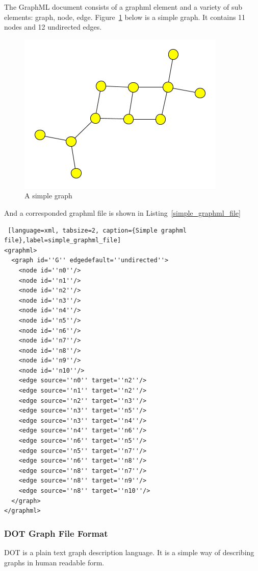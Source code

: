 The GraphML document consists of a graphml element and a variety of sub elements: graph, node, edge. Figure~\ref{fig:simple_graphml} below is a simple graph. It contains 11 nodes and 12 undirected edges.

\begin{figure}[h!]
\centering
\includegraphics[scale=1.0]{pictures/simple.png}
\caption{A simple graph}
\label{fig:simple_graphml}
\end{figure}


And a corresponded graphml file is shown in Listing~\ref{simple_graphml_file}

\begin{center}
\begin{lstlisting} [language=xml, tabsize=2, caption={Simple graphml file},label=simple_graphml_file]
<graphml>
  <graph id=''G'' edgedefault=''undirected''>
    <node id=''n0''/>
    <node id=''n1''/>
    <node id=''n2''/>
    <node id=''n3''/>
    <node id=''n4''/>
    <node id=''n5''/>
    <node id=''n6''/>
    <node id=''n7''/>
    <node id=''n8''/>
    <node id=''n9''/>
    <node id=''n10''/>
    <edge source=''n0'' target=''n2''/>
    <edge source=''n1'' target=''n2''/>
    <edge source=''n2'' target=''n3''/>
    <edge source=''n3'' target=''n5''/>
    <edge source=''n3'' target=''n4''/>
    <edge source=''n4'' target=''n6''/>
    <edge source=''n6'' target=''n5''/>
    <edge source=''n5'' target=''n7''/>
    <edge source=''n6'' target=''n8''/>
    <edge source=''n8'' target=''n7''/>
    <edge source=''n8'' target=''n9''/>
    <edge source=''n8'' target=''n10''/>
  </graph>
</graphml>
\end{lstlisting}
\end{center}

\subsubsection{DOT Graph File Format}
DOT is a plain text graph description language. It is a simple way of describing graphs in human readable form.

